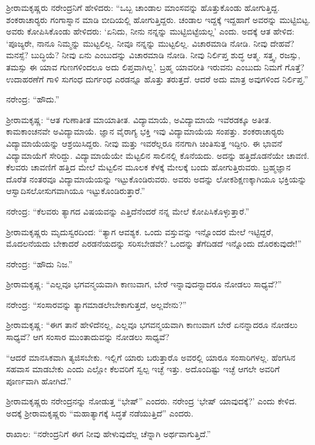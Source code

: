 ಶ‍್ರೀರಾಮಕೃಷ್ಣರು ನರೇಂದ್ರನಿಗೆ ಹೇಳಿದರು: “ಒಬ್ಬ ಚಾಂಡಾಲ ಮಾಂಸವನ್ನು ಹೊತ್ತುಕೊಂಡು ಹೋಗುತ್ತಿದ್ದ. ಶಂಕರಾಚಾರ‍್ಯರು ಗಂಗಾಸ್ನಾನ ಮಾಡಿ ಬೀದಿಯಲ್ಲಿ ಹೋಗುತ್ತಿದ್ದರು. ಚಂಡಾಲ ಇದ್ದಕ್ಕೆ ಇದ್ದಹಾಗೆ ಅವರನ್ನು ಮುಟ್ಟಿಬಿಟ್ಟ. ಅವರು ಕೋಪಿಸಿಕೊಂಡು ಹೇಳಿದರು: ‘ಏನಿದು, ನೀನು ನನ್ನನ್ನು ಮುಟ್ಟಿಬಿಟ್ಟೆಯಲ್ಲ’ ಎಂದು. ಅದಕ್ಕೆ ಆತ ಹೇಳಿದ: ‘ಪೂಜ್ಯರೇ, ನಾನೂ ನಿಮ್ಮನ್ನು ಮುಟ್ಟಲಿಲ್ಲ. ನೀವೂ ನನ್ನನ್ನು ಮುಟ್ಟಲಿಲ್ಲ. ವಿಚಾರಮಾಡಿ ನೋಡಿ. ನೀವು ದೇಹವೆ? ಮನಸ್ಸೆ? ಬುದ್ಧಿಯೆ? ನೀವು ಏನು ಎಂಬುದನ್ನು ವಿಚಾರಮಾಡಿ ನೋಡಿ. ನೀವು ನಿರ್ಲಿಪ್ತ ಶುದ್ಧ ಆತ್ಮ. ಸತ್ತ್ವ, ರಜಸ್ಸು, ತಮಸ್ಸು ಈ ಯಾವ ಗುಣಗಳಿಂದಲೂ ಅದು ಲಿಪ್ತವಾಗಿಲ್ಲ’. ಬ್ರಹ್ಮ ಯಾವರೀತಿ ಇರುವನು ಎಂಬುದು ನಿಮಗೆ ಗೊತ್ತೆ? ಉದಾಹರಣೆಗೆ ಗಾಳಿ ಸುಗಂಧ ದುರ್ಗಂಧ ಎರಡನ್ನೂ ಹೊತ್ತು ತರುತ್ತದೆ. ಆದರೆ ಅದು ಮಾತ್ರ ಅವುಗಳಿಂದ ನಿರ್ಲಿಪ್ತ.”

ನರೇಂದ್ರ: “ಹೌದು.”

ಶ‍್ರೀರಾಮಕೃಷ್ಣ: “ಆತ ಗುಣಾತೀತ ಮಾಯಾತೀತ. ವಿದ್ಯಾಮಾಯೆ, ಅವಿದ್ಯಾಮಾಯೆ ಇವೆರಡಕ್ಕೂ ಅತೀತ. ಕಾಮಕಾಂಚನವೇ ಅವಿದ್ಯಾಮಾಯೆ. ಜ್ಞಾನ ವೈರಾಗ್ಯ ಭಕ್ತಿ ಇವು ವಿದ್ಯಾಮಾಯೆಯ ಸಂಪತ್ತು. ಶಂಕರಾಚಾರ‍್ಯರು ವಿದ್ಯಾಮಾಯೆಯನ್ನು ಆಶ್ರಯಿಸಿದ್ದರು. ನೀವು ಮತ್ತು ಇವರೆಲ್ಲರೂ ನನಗಾಗಿ ಚಿಂತಿಸುತ್ತ ಇದ್ದೀರಿ. ಈ ಭಾವನೆ ವಿದ್ಯಾಮಾಯೆಗೆ ಸೇರಿದ್ದು. ವಿದ್ಯಾಮಾಯೆಯೇ ಮೆಟ್ಟಲಿನ ಸಾಲಿನಲ್ಲಿ ಕೊನೆಯದು. ಅದನ್ನು ಹತ್ತಿದೊಡನೆಯೇ ಚಾವಣಿ. ಕೆಲವರು ಚಾವಣಿಗೆ ಹತ್ತಿದ ಮೇಲೆ ಮೆಟ್ಟಲಿನ ಮೂಲಕ ಕೆಳಕ್ಕೆ ಮೇಲಕ್ಕೆ ಬಂದು ಹೋಗುತ್ತಿರುವರು. ಬ್ರಹ್ಮಜ್ಞಾನ ದೊರೆತ ನಂತರವೂ ವಿದ್ಯಾಮಾಯೆಯನ್ನು ಇಟ್ಟುಕೊಂಡಿರುವರು. ಅವರು ಅದನ್ನು ಲೋಕಶಿಕ್ಷಣಕ್ಕಾಗಿಯೂ ಭಕ್ತಿಯನ್ನು ಆಸ್ವಾದಿಸಲೋಸುಗವಾಗಿಯೂ ಇಟ್ಟುಕೊಂಡಿರುತ್ತಾರೆ.”

ನರೇಂದ್ರ: “ಕೆಲವರು ತ್ಯಾಗದ ವಿಷಯವನ್ನು ಎತ್ತಿದೆನೆಂದರೆ ನನ್ನ ಮೇಲೆ ಕೋಪಿಸಿಕೊಳ್ಳುತ್ತಾರೆ.”

ಶ‍್ರೀರಾಮಕೃಷ್ಣರು ಮೃದುಸ್ವರದಿಂದ: “ತ್ಯಾಗ ಆವಶ್ಯಕ. ಒಂದು ವಸ್ತುವನ್ನು ಇನ್ನೊಂದರ ಮೇಲೆ ಇಟ್ಟಿದ್ದರೆ, ಮೊದಲನೆಯದು ಬೇಕಾದರೆ ಎರಡನೆಯದನ್ನು ಸರಿಸಬೇಡವೇ? ಒಂದನ್ನು ತೆಗೆದಿಡದೆ ಇನ್ನೊಂದು ದೊರಕುವುದೇ!”

ನರೇಂದ್ರ: “ಹೌದು ನಿಜ.”

ಶ‍್ರೀರಾಮಕೃಷ್ಣ: “ಎಲ್ಲವೂ ಭಗವನ್ಮಯವಾಗಿ ಕಾಣುವಾಗ, ಬೇರೆ ಇನ್ನಾವುದನ್ನಾದರೂ ನೋಡಲು ಸಾಧ್ಯವೆ?”

ನರೇಂದ್ರ: “ಸಂಸಾರವನ್ನು ತ್ಯಾಗಮಾಡಲೇಬೇಕಾಗುತ್ತದೆ, ಅಲ್ಲವೇನು?”

ಶ‍್ರೀರಾಮಕೃಷ್ಣ: “ಈಗ ತಾನೆ ಹೇಳಿದೆನಲ್ಲ, ಎಲ್ಲವೂ ಭಗವನ್ಮಯವಾಗಿ ಕಾಣುವಾಗ ಬೇರೆ ಏನನ್ನಾದರೂ ನೋಡಲು ಸಾಧ್ಯವೆ? ಆಗ ಸಂಸಾರ ಮುಂತಾದುವನ್ನು ನೋಡಲು ಸಾಧ್ಯವೆ?

“ಆದರೆ ಮಾನಸಿಕವಾಗಿ ತ್ಯಜಿಸಬೇಕು. ಇಲ್ಲಿಗೆ ಯಾರು ಬರುತ್ತಾರೊ ಅವರಲ್ಲಿ ಯಾರೂ ಸಂಸಾರಿಗಳಲ್ಲ. ಹೆಂಗಸಿನ ಸಹವಾಸ ಮಾಡಬೇಕು ಎಂದು ಎಲ್ಲೋ ಕೆಲವರಿಗೆ ಸ್ವಲ್ಪ ಇಚ್ಛೆ ಇತ್ತು. ಅದೊಂದಿಷ್ಟು ಇಚ್ಛೆ ಆಗಲೇ ಅವರಿಗೆ ಪೂರ್ಣವಾಗಿ ಹೋಗಿದೆ.”

ಶ‍್ರೀರಾಮಕೃಷ್ಣರು ನರೇಂದ್ರನನ್ನು ನೋಡುತ್ತ “ಭೇಷ್” ಎಂದರು. ನರೇಂದ್ರ ‘ಭೇಷ್ ಯಾವುದಕ್ಕೆ?’ ಎಂದು ಕೇಳಿದ. ಅದಕ್ಕೆ ಶ‍್ರೀರಾಮಕೃಷ್ಣರು “ಮಹಾತ್ಯಾಗಕ್ಕೆ ಸಿದ್ಧತೆ ನಡೆಯುತ್ತಿದೆ” ಎಂದರು.

ರಾಖಾಲ: “ನರೇಂದ್ರನಿಗೆ ಈಗ ನೀವು ಹೇಳುವುದೆಲ್ಲ ಚೆನ್ನಾಗಿ ಅರ್ಥವಾಗುತ್ತಿದೆ.”

